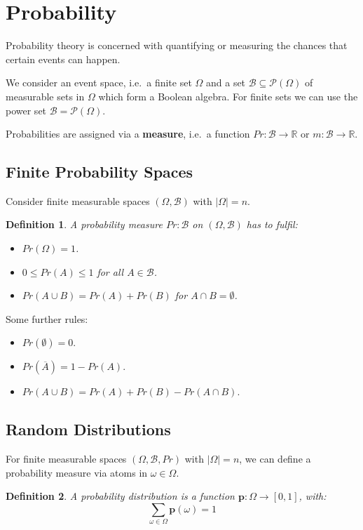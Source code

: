 \documentclass[11pt]{article}
\newtheorem{defn}{Definition}
\begin{document}
\section{Probability}
Probability theory is concerned with quantifying or measuring the chances that certain events can happen.

We consider an event space, i.e.\ a finite set $\Omega$ and a set $\mathcal{B} \subseteq \mathcal{P}(\Omega)$ of measurable sets in $\Omega$ which form a Boolean algebra.
For finite sets we can use the power set $\mathcal{B} = \mathcal{P}(\Omega)$.

Probabilities are assigned via a \textbf{measure}, i.e.\ a function $Pr : \mathcal{B} \rightarrow \mathbb{R}$ or $m : \mathcal{B} \rightarrow \mathbb{R}$.

\subsection{Finite Probability Spaces}
Consider finite measurable spaces $(\Omega, \mathcal{B})$ with $\lvert \Omega \rvert = n$.

\begin{defn}
  A probability measure $Pr : \mathcal{B}$ on $(\Omega, \mathcal{B})$ has to fulfil:
  \begin{itemize}
    \item $Pr(\Omega) = 1$.
    \item $0 \leq Pr(A) \leq 1$ for all $A \in \mathcal{B}$.
    \item $Pr(A \cup B) = Pr(A) + Pr(B)$ for $A \cap B = \emptyset$.
  \end{itemize}
\end{defn}

Some further rules:
\begin{itemize}
  \item $Pr(\emptyset) = 0$.
  \item $Pr(\overline{A}) = 1 - Pr(A)$.
  \item $Pr(A \cup B) = Pr(A) + Pr(B) - Pr(A \cap B)$.
\end{itemize}

\subsection{Random Distributions}
For finite measurable spaces $(\Omega, \mathcal{B}, Pr)$ with $\lvert \Omega \rvert = n$, we can define a probability measure via atoms in $\omega \in \Omega$.

\begin{defn}
  A probability distribution is a function $\textbf{p} : \Omega \rightarrow [0, 1]$, with:
  \[
    \sum_{\omega \in \Omega} \textbf{p}(\omega) = 1
  \]
\end{defn}
\end{document}
